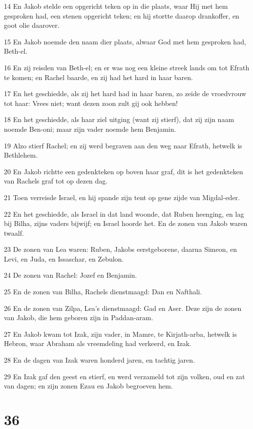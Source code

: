 \par 14 En Jakob stelde een opgericht teken op in die plaats, waar Hij met hem gesproken had, een stenen opgericht teken; en hij stortte daarop drankoffer, en goot olie daarover.
\par 15 En Jakob noemde den naam dier plaats, alwaar God met hem gesproken had, Beth-el.
\par 16 En zij reisden van Beth-el; en er was nog een kleine streek lands om tot Efrath te komen; en Rachel baarde, en zij had het hard in haar baren.
\par 17 En het geschiedde, als zij het hard had in haar baren, zo zeide de vroedvrouw tot haar: Vrees niet; want dezen zoon zult gij ook hebben!
\par 18 En het geschiedde, als haar ziel uitging (want zij stierf), dat zij zijn naam noemde Ben-oni; maar zijn vader noemde hem Benjamin.
\par 19 Alzo stierf Rachel; en zij werd begraven aan den weg naar Efrath, hetwelk is Bethlehem.
\par 20 En Jakob richtte een gedenkteken op boven haar graf, dit is het gedenkteken van Rachels graf tot op dezen dag.
\par 21 Toen verreisde Israel, en hij spande zijn tent op gene zijde van Migdal-eder.
\par 22 En het geschiedde, als Israel in dat land woonde, dat Ruben heenging, en lag bij Bilha, zijns vaders bijwijf; en Israel hoorde het. En de zonen van Jakob waren twaalf.
\par 23 De zonen van Lea waren: Ruben, Jakobs eerstgeborene, daarna Simeon, en Levi, en Juda, en Issaschar, en Zebulon.
\par 24 De zonen van Rachel: Jozef en Benjamin.
\par 25 En de zonen van Bilha, Rachels dienstmaagd: Dan en Nafthali.
\par 26 En de zonen van Zilpa, Lea's dienstmaagd: Gad en Aser. Deze zijn de zonen van Jakob, die hem geboren zijn in Paddan-aram.
\par 27 En Jakob kwam tot Izak, zijn vader, in Mamre, te Kirjath-arba, hetwelk is Hebron, waar Abraham als vreemdeling had verkeerd, en Izak.
\par 28 En de dagen van Izak waren honderd jaren, en tachtig jaren.
\par 29 En Izak gaf den geest en stierf, en werd verzameld tot zijn volken, oud en zat van dagen; en zijn zonen Ezau en Jakob begroeven hem.

\chapter{36}

